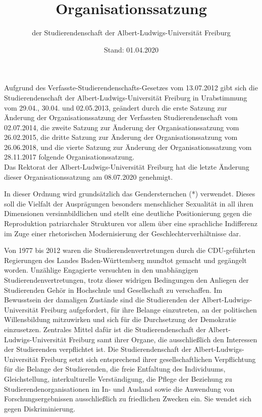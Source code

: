 \documentclass[fontsize=12pt,parskip=half]{scrartcl}
\begin{document}
\subject{Lesefassung}
\title{Organisationssatzung}
\subtitle{der Studierendenschaft der Albert-Ludwigs-Universität Freiburg}
\date{Stand: 01.04.2020}
\maketitle

\pagebreak

\tableofcontents

\vspace*{\fill}

Aufgrund des Verfasste-Studierendenschafts-Gesetzes vom 13.07.2012 gibt sich die
Studierendenschaft der Albert-Ludwigs-Universität Freiburg in Urabstimmung vom
29.04., 30.04. und 02.05.2013, geändert durch die erste Satzung zur Änderung der
Organisationssatzung der Verfassten Studierendenschaft vom 02.07.2014, die
zweite Satzung zur Änderung der Organisationssatzung vom 26.02.2015, die
dritte Satzung zur Änderung der Organisationssatzung vom 26.06.2018, und die
vierte Satzung zur Änderung der Organisationssatzung vom 28.11.2017 folgende
Organisationssatzung.\\
Das Rektorat der Albert-Ludwigs-Universität Freiburg hat die letzte Änderung
dieser Organisationssatzung am 08.07.2020 genehmigt.

In dieser Ordnung wird grundsätzlich das Gendersternchen (*) verwendet. Dieses
soll die Vielfalt der Ausprägungen besonders menschlicher Sexualität in all
ihren Dimensionen versinnbildlichen und stellt eine deutliche Positionierung
gegen die Reproduktion patriarchaler Strukturen vor allem über eine sprachliche
Indifferenz im Zuge einer rhetorischen Modernisierung der
Geschlechterverhältnisse dar.

\pagebreak


Von 1977 bis 2012 waren die Studierendenvertretungen durch die CDU-geführten
Regierungen des Landes Baden-Württemberg mundtot gemacht und gegängelt worden.
Unzählige Engagierte versuchten in den unabhängigen Studierendenvertretungen,
trotz dieser widrigen Bedingungen den Anliegen der Studierenden Gehör in
Hochschule und Gesellschaft zu verschaffen. Im Bewusstsein der damaligen
Zustände sind die Studierenden der Albert-Ludwigs-Universität Freiburg
aufgefordert, für ihre Belange einzutreten, an der politischen Willensbildung
mitzuwirken und sich für die Durchsetzung der Demokratie einzusetzen. Zentrales
Mittel dafür ist die Studierendenschaft der Albert-Ludwigs-Universität Freiburg
samt ihrer Organe, die ausschließlich den Interessen der Studierenden
verpflichtet ist.
Die Studierendenschaft der Albert-Ludwigs-Universität Freiburg setzt sich
entsprechend ihrer gesellschaftlichen Verpflichtung für die Belange der
Studierenden, die freie Entfaltung des Individuums, Gleichstellung,
interkulturelle Verständigung, die Pflege der Beziehung zu
Studierendenorganisationen im In- und Ausland sowie die Anwendung von
Forschungsergebnissen ausschließlich zu friedlichen Zwecken ein. Sie wendet sich
gegen Diskriminierung.
\end{document}
